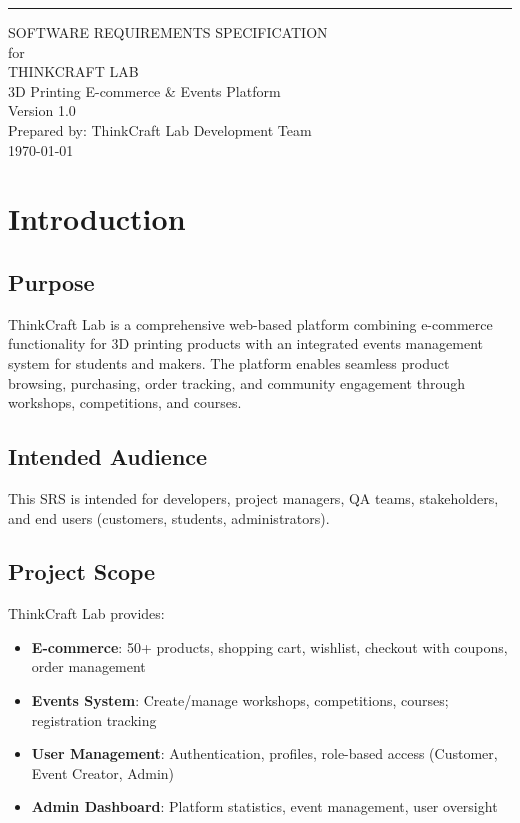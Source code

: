 \documentclass[11pt]{scrreprt}
\date{}
\def\myversion{1.0 }
\begin{document}
\begin{flushright}
\rule{16cm}{5pt}\vskip0.5cm
\begin{bfseries}
\Huge{SOFTWARE REQUIREMENTS SPECIFICATION}\\
\vspace{1cm}
for\\
\vspace{1cm}
THINKCRAFT LAB\\
3D Printing E-commerce \& Events Platform\\
\vspace{1cm}
\LARGE{Version \myversion}\\
\vspace{1cm}
Prepared by: ThinkCraft Lab Development Team\\
\vspace{0.5cm}
\today\\
\end{bfseries}
\end{flushright}

\tableofcontents

\chapter{Introduction}

\section{Purpose}
ThinkCraft Lab is a comprehensive web-based platform combining e-commerce functionality for 3D printing products with an integrated events management system for students and makers. The platform enables seamless product browsing, purchasing, order tracking, and community engagement through workshops, competitions, and courses.

\section{Intended Audience}
This SRS is intended for developers, project managers, QA teams, stakeholders, and end users (customers, students, administrators).

\section{Project Scope}
ThinkCraft Lab provides:
\begin{itemize}
\item \textbf{E-commerce}: 50+ products, shopping cart, wishlist, checkout with coupons, order management
\item \textbf{Events System}: Create/manage workshops, competitions, courses; registration tracking
\item \textbf{User Management}: Authentication, profiles, role-based access (Customer, Event Creator, Admin)
\item \textbf{Admin Dashboard}: Platform statistics, event management, user oversight
\end{itemize}
\end{document}

